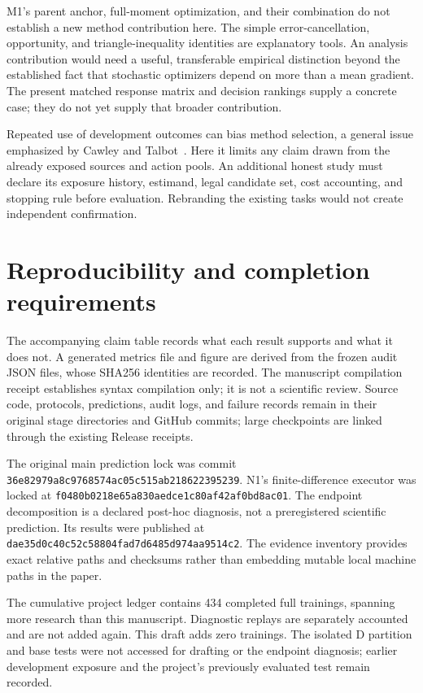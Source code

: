 \documentclass[11pt]{article}
\begin{document}
M1's parent anchor, full-moment optimization, and their combination do not establish a new method contribution here. The simple error-cancellation, opportunity, and triangle-inequality identities are explanatory tools. An analysis contribution would need a useful, transferable empirical distinction beyond the established fact that stochastic optimizers depend on more than a mean gradient. The present matched response matrix and decision rankings supply a concrete case; they do not yet supply that broader contribution.

Repeated use of development outcomes can bias method selection, a general issue emphasized by Cawley and Talbot~\cite{cawley}. Here it limits any claim drawn from the already exposed sources and action pools. An additional honest study must declare its exposure history, estimand, legal candidate set, cost accounting, and stopping rule before evaluation. Rebranding the existing tasks would not create independent confirmation.

\section{Reproducibility and completion requirements}
The accompanying claim table records what each result supports and what it does not. A generated metrics file and figure are derived from the frozen audit JSON files, whose SHA256 identities are recorded. The manuscript compilation receipt establishes syntax compilation only; it is not a scientific review. Source code, protocols, predictions, audit logs, and failure records remain in their original stage directories and GitHub commits; large checkpoints are linked through the existing Release receipts.

The original main prediction lock was commit \texttt{36e82979a8c9768574ac05c515ab218622395239}. N1's finite-difference executor was locked at \texttt{f0480b0218e65a830aedce1c80af42af0bd8ac01}. The endpoint decomposition is a declared post-hoc diagnosis, not a preregistered scientific prediction. Its results were published at \texttt{dae35d0c40c52c58804fad7d6485d974aa9514c2}. The evidence inventory provides exact relative paths and checksums rather than embedding mutable local machine paths in the paper.

The cumulative project ledger contains 434 completed full trainings, spanning more research than this manuscript. Diagnostic replays are separately accounted and are not added again. This draft adds zero trainings. The isolated D partition and base tests were not accessed for drafting or the endpoint diagnosis; earlier development exposure and the project's previously evaluated test remain recorded.
\end{document}
